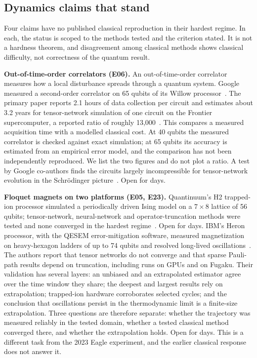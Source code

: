 \subsection{Dynamics claims that stand}
Four claims have no published classical reproduction in their hardest regime. In each, the status is scoped to the methods tested and the criterion stated. It is not a hardness theorem, and disagreement among classical methods shows classical difficulty, not correctness of the quantum result.

\textbf{Out-of-time-order correlators (E06).} An out-of-time-order correlator measures how a local disturbance spreads through a quantum system. Google measured a second-order correlator on 65 qubits of its Willow processor~\cite{google2025otoc}. The primary paper reports 2.1 hours of data collection per circuit and estimates about 3.2 years for tensor-network simulation of one circuit on the Frontier supercomputer, a reported ratio of roughly 13{,}000~\cite{google2025otoc,googleblog2025}. This compares a measured acquisition time with a modelled classical cost. At 40 qubits the measured correlator is checked against exact simulation; at 65 qubits its accuracy is estimated from an empirical error model, and the comparison has not been independently reproduced. We list the two figures and do not plot a ratio. A test by Google co-authors finds the circuits largely incompressible for tensor-network evolution in the Schr\"odinger picture~\cite{bermejo2026}. Open for  days.

\textbf{Floquet magnets on two platforms (E05, E23).} Quantinuum's H2 trapped-ion processor simulated a periodically driven Ising model on a $7\times8$ lattice of 56 qubits; tensor-network, neural-network and operator-truncation methods were tested and none converged in the hardest regime~\cite{haghshenas2025}. Open for  days. IBM's Heron processor, with the QESEM error-mitigation software, measured magnetization on heavy-hexagon ladders of up to 74 qubits and resolved long-lived oscillations~\cite{leviatan2026}. The authors report that tensor networks do not converge and that sparse Pauli-path results depend on truncation, including runs on GPUs and on Fugaku. Their validation has several layers: an unbiased and an extrapolated estimator agree over the time window they share; the deepest and largest results rely on extrapolation; trapped-ion hardware corroborates selected cycles; and the conclusion that oscillations persist in the thermodynamic limit is a finite-size extrapolation. Three questions are therefore separate: whether the trajectory was measured reliably in the tested domain, whether a tested classical method converged there, and whether the extrapolation holds. Open for  days. This is a different task from the 2023 Eagle experiment, and the earlier classical response does not answer it.

